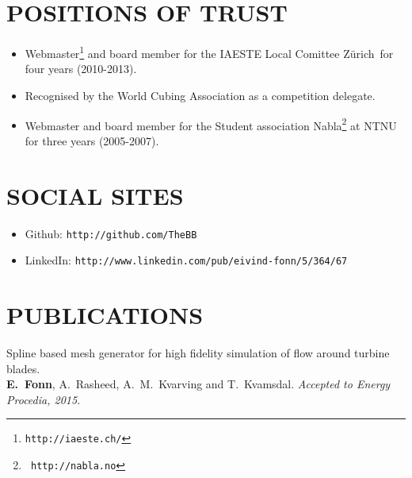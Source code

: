\documentclass[line,margin]{res}
\newcommand{\zh}{Z\"{u}rich}
\begin{document}
\begin{resume}
\section{POSITIONS OF TRUST}

\begin{itemize}
\item Webmaster\footnote{{\tt http://iaeste.ch/}} and board member for the
  IAESTE Local Comittee \zh\ for four years (2010-2013).
\item Recognised by the World Cubing Association as a competition delegate.
\item Webmaster and board member for the Student association Nabla\footnote{{\tt
    http://nabla.no}} at NTNU for three years (2005-2007).
\end{itemize}






\section{SOCIAL SITES}

\begin{itemize}
\item Github: \texttt{http://github.com/TheBB}
\item LinkedIn: \texttt{http://www.linkedin.com/pub/eivind-fonn/5/364/67}
\end{itemize}


\section{PUBLICATIONS}

Spline based mesh generator for high fidelity simulation of flow around turbine blades. \\
{\bf E.~Fonn}, A.~Rasheed, A.~M.~Kvarving and T.~Kvamsdal.
{\em Accepted to Energy Procedia, 2015.}


\end{resume}
\end{document}
